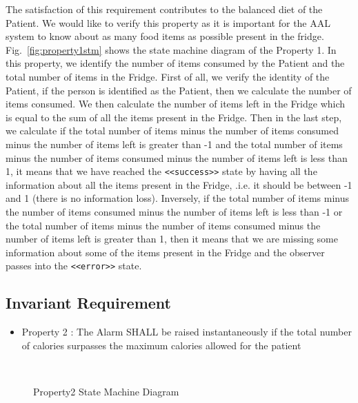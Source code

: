 \documentclass[a4paper,twoside]{article}
\begin{document}
The satisfaction of this requirement contributes to the balanced diet of the Patient. We would like to verify this property as it is important for the AAL system to know about as many food items as possible present in the fridge. Fig.~\ref{fig:property1stm} shows the state machine diagram of the Property 1. In this property, we identify the number of items consumed by the Patient and the total number of items in the Fridge. First of all, we verify the identity of the Patient, if the person is identified as the Patient, then we calculate the number of items consumed. We then calculate the number of items left in the Fridge which is equal to the sum of all the items present in the Fridge. Then in the last step, we calculate if the total number of items minus the number of items consumed minus the number of items left is greater than -1 and the total number of items minus the number of items consumed minus the number of items left is less than 1, it means that we have reached the \texttt{<<success>>} state by having all the information about all the items present in the Fridge, .i.e. it should be between -1 and 1 (there is no information loss). Inversely, if the total number of items minus the number of items consumed minus the number of items left is less than -1 or the total number of items minus the number of items consumed minus the number of items left is greater than 1, then it means that we are missing some information about some of the items present in the Fridge and the observer passes into the \texttt{<<error>>} state.


\subsection{Invariant Requirement}

\begin{itemize}
\item Property 2 : The Alarm SHALL be raised instantaneously if the total number of calories surpasses the maximum calories allowed for the patient 
\end{itemize}


\begin{figure}[!h]
  \vspace{8cm}~
  \centering
  {}
  \caption{Property2 State Machine Diagram}
  \label{fig:property3stm}
 \end{figure}
 
\end{document}

